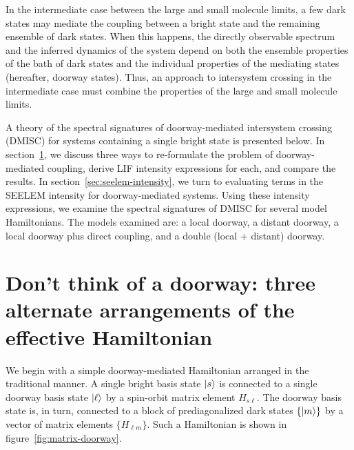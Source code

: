 In the intermediate case between the large and small molecule limits,
a few dark states may mediate the coupling between a bright state and
the remaining ensemble of dark states. When this happens, the directly
observable spectrum and the inferred dynamics of the system depend on
both the ensemble properties of the bath of dark states and the
individual properties of the mediating states (hereafter, doorway
states). Thus, an approach to intersystem crossing in the intermediate
case must combine the properties of the large and small molecule
limits.

A theory of the spectral signatures of doorway-mediated intersystem
crossing (DMISC) for systems containing a single bright state is
presented below. In section~\ref{sec:arrangements}, we discuss three
ways to re-formulate the problem of doorway-mediated coupling, derive
LIF intensity expressions for each, and compare the results.  In
section~\ref{sec:seelem-intensity}, we turn to evaluating terms in the
SEELEM intensity for doorway-mediated systems.  Using these intensity
expressions, we examine the spectral signatures of DMISC for several
model Hamiltonians.  The models examined are: a local doorway, a
distant doorway, a local doorway plus direct coupling, and a double
(local + distant) doorway.


\section{Don't think of a doorway: three alternate arrangements of
  the effective Hamiltonian}
\label{sec:arrangements}

We begin with a simple doorway-mediated Hamiltonian arranged in the
traditional manner. A single bright basis state $\mathinner{|{s}\rangle}$ is connected
to a single doorway basis state $\mathinner{|{\ell}\rangle}$ by a spin-orbit matrix
element $H_{s \ell}$. The doorway basis state is, in turn, connected
to a block of prediagonalized dark states $\lbrace \mathinner{|{m}\rangle} \rbrace$ by
a vector of matrix elements $\lbrace H_{\ell m} \rbrace$. Such a
Hamiltonian is shown in figure~\ref{fig:matrix-doorway}.


